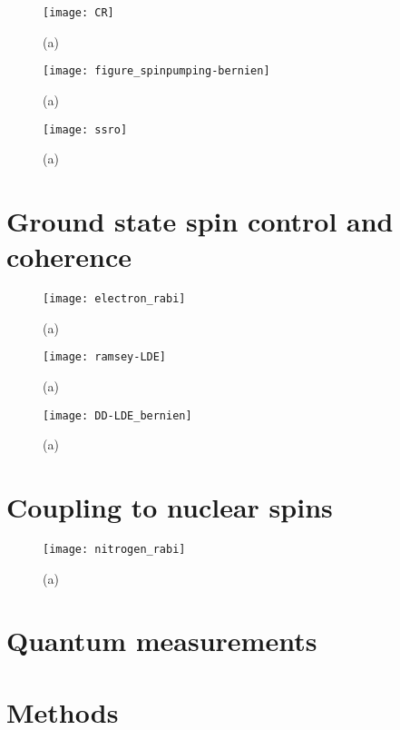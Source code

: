 \begin{figure*}
	\centering
	\texttt{[image: CR]}
	\caption{\label{fig:tam-fig4-cr} \textbf{} (a) }
\end{figure*}

\begin{figure*}
	\centering
	\texttt{[image: figure\_spinpumping-bernien]}
	\caption{\label{fig:tam-fig5-SP} \textbf{} (a) }
\end{figure*}

\begin{figure*}
	\centering
	\texttt{[image: ssro]}
	\caption{\label{fig:tam-fig6-ssro} \textbf{} (a) }
\end{figure*}

\section{Ground state spin control and coherence}

\begin{figure*}
	\centering
	\texttt{[image: electron\_rabi]}
	\caption{\label{fig:tam-fig7-erabi} \textbf{} (a) }
\end{figure*}

\begin{figure*}
	\centering
	\texttt{[image: ramsey-LDE]}
	\caption{\label{fig:tam-fig8-eramsey} \textbf{} (a) }
\end{figure*}

\begin{figure*}
	\centering
	\texttt{[image: DD-LDE\_bernien]}
	\caption{\label{fig:tam-fig9-DD} \textbf{} (a) }
\end{figure*}

\section{Coupling to nuclear spins}
\begin{figure*}
	\centering
	\texttt{[image: nitrogen\_rabi]}
	\caption{\label{fig:tam-fig1-nrabi} \textbf{} (a) }
\end{figure*}
\section{Quantum measurements}


\section{Methods}



\newpage




